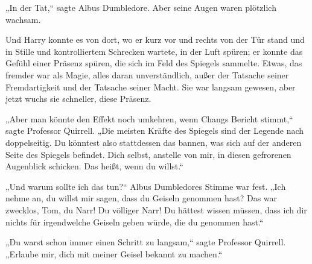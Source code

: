 „In der Tat,“ sagte Albus Dumbledore.
Aber seine Augen waren plötzlich wachsam.

Und Harry konnte es von dort, wo er kurz vor und rechts von der Tür stand und in Stille und kontrolliertem Schrecken wartete, in der Luft spüren; er konnte das Gefühl einer Präsenz spüren, die sich im Feld des Spiegels sammelte. Etwas, das fremder war als Magie, alles daran unverständlich, außer der Tatsache seiner Fremdartigkeit und der Tatsache seiner Macht. Sie war langsam gewesen, aber jetzt wuchs sie schneller, diese Präsenz.

„Aber man könnte den Effekt noch umkehren, wenn Changs Bericht stimmt,“ sagte Professor Quirrell. „Die meisten Kräfte des Spiegels sind der Legende nach doppelseitig. Du könntest also stattdessen das bannen, was sich auf der anderen Seite des Spiegels befindet. Dich selbst, anstelle von mir, in diesen gefrorenen Augenblick schicken. Das heißt, wenn du willst.“

„Und warum sollte ich das tun?“ Albus Dumbledores Stimme war fest.
„Ich nehme an, du willst mir sagen, dass du Geiseln genommen hast? Das war zwecklos, Tom, du Narr! Du völliger Narr! Du hättest wissen müssen, dass ich dir nichts für irgendwelche Geiseln geben würde, die du genommen hast.“

„Du warst schon immer einen Schritt zu langsam,“ sagte Professor Quirrell.
„Erlaube mir, dich mit meiner Geisel bekannt zu machen.“

